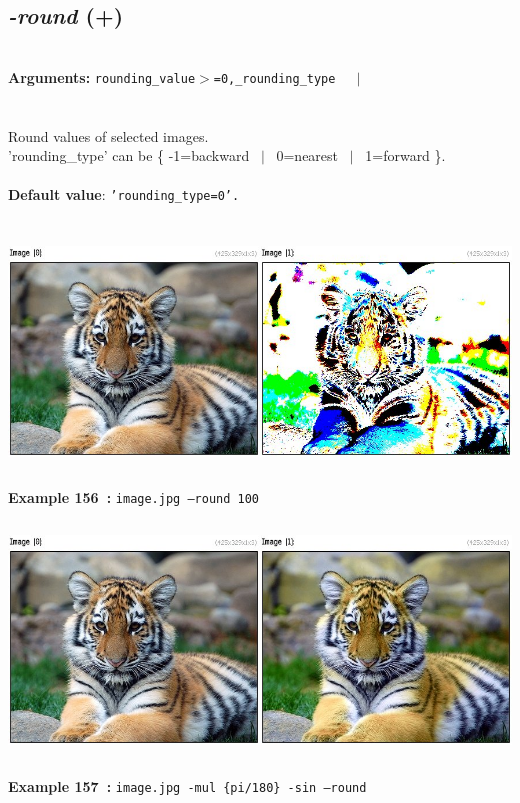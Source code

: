 \documentclass[a4paper,11pt,twoside]{book}
\begin{document}
\subsection{\emph{-round} (+)}\vspace*{-0.5em}
~\\\textbf{Arguments: } 
{\small \texttt{rounding\_value$>$=0,\_rounding\_type}}~~~$|$\\
\\~\\
Round values of selected images.
~\\'rounding\_type' can be \{ -1=backward ~$|$~ 0=nearest ~$|$~ 1=forward \}.
~\\~\\\textbf{Default value}: {\small \texttt{'rounding\_type=0'.}}
\begin{center}\includegraphics[keepaspectratio=true,height=7cm,width=\textwidth]{img/gmic_def156.jpg}\\
{\footnotesize \textbf{Example 156~:} \texttt{image.jpg --round 100}}
\\\includegraphics[keepaspectratio=true,height=7cm,width=\textwidth]{img/gmic_def157.jpg}\\
{\footnotesize \textbf{Example 157~:} \texttt{image.jpg -mul \{pi/180\} -sin --round}}
\end{center}
\end{document}
